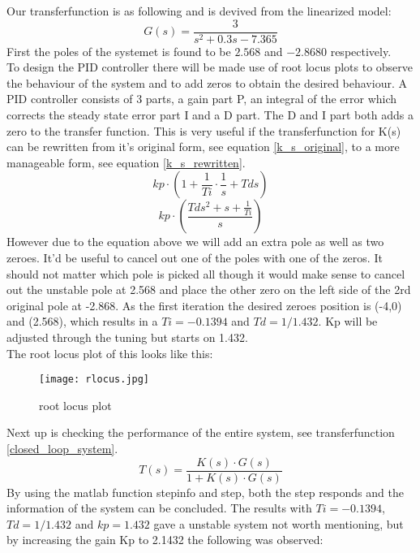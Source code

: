 \documentclass[12pt]{article}
\begin{document}
Our transferfunction is as following and is devived from the linearized model:
\begin{equation} \label{G_s}
  G(s) = \frac{3}{s^2 + 0.3s -7.365}
\end{equation}
First the poles of the systemet is found to be $2.568$ and $-2.8680$ respectively.\\
To design the PID controller there will be made use of root locus plots to observe the behaviour of the system and to add zeros to obtain the desired behaviour. A PID controller consists of 3 parts, a gain part P, an integral of the error which corrects the steady state error part I and a D part. The D and I part both adds a zero to the transfer function. This is very useful if the transferfunction for K(s) can be rewritten from it's original form, see equation \ref{k_s_original}, to a more manageable form, see equation \ref{k_s_rewritten}.
\begin{equation} \label{k_s_original}
  kp\cdot(1+\frac{1}{Ti}\cdot \frac{1}{s}+Tds)
\end{equation}
\begin{equation} \label{k_s_rewritten}
  kp\cdot(\frac{Tds^2 + s + \frac{1}{Ti}}{s})
\end{equation}
However due to the equation above we will add an extra pole as well as two zeroes. It'd be useful to cancel out one of the poles with one of the zeros. It should not matter which pole is picked all though it would make sense to cancel out the unstable pole at 2.568 and place the other zero on the left side of the 2rd original pole at -2.868. As the first iteration the desired zeroes position is (-4,0) and (2.568), which results in a $Ti = -0.1394$ and $Td = 1/1.432$. Kp will be adjusted through the tuning but starts on 1.432.\\
The root locus plot of this looks like this:
\begin{figure}[htbp]
  \centering
  \texttt{[image: rlocus.jpg]}
  \caption{root locus plot} \label{my_root_locus_plot}
\end{figure}
Next up is checking the performance of the entire system, see transferfunction \ref{closed_loop_system}.
\begin{equation} \label{closed_loop_system}
    T(s) = \frac{K(s) \cdot G(s)}{1+K(s)\cdot G(s)}
\end{equation}
By using the matlab function stepinfo and step, both the step responds and the information of the system can be concluded. The results with $Ti = -0.1394$, $Td = 1/1.432$ and $kp = 1.432$ gave a unstable system not worth mentioning, but by increasing the gain Kp to 2.1432 the following was observed:
\end{document}
